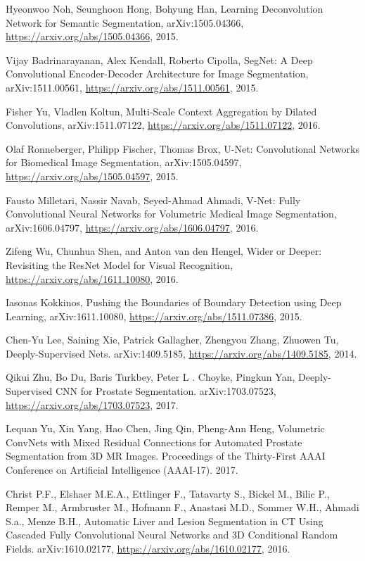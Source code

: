 \documentclass[11pt]{article}
\begin{document}
\begin{thebibliography}{9}
  Hyeonwoo Noh, Seunghoon Hong, Bohyung Han,
  Learning Deconvolution Network for Semantic Segmentation,
  arXiv:1505.04366,
  \url{https://arxiv.org/abs/1505.04366}, 2015.

  Vijay Badrinarayanan, Alex Kendall, Roberto Cipolla,
  SegNet: A Deep Convolutional Encoder-Decoder Architecture for Image Segmentation,
  arXiv:1511.00561,
  \url{https://arxiv.org/abs/1511.00561}, 2015.

  Fisher Yu, Vladlen Koltun,
  Multi-Scale Context Aggregation by Dilated Convolutions,
  arXiv:1511.07122,
  \url{https://arxiv.org/abs/1511.07122}, 2016.

  Olaf Ronneberger, Philipp Fischer, Thomas Brox,
  U-Net: Convolutional Networks for Biomedical Image Segmentation,
  arXiv:1505.04597,
  \url{https://arxiv.org/abs/1505.04597}, 2015.

  Fausto Milletari, Nassir Navab, Seyed-Ahmad Ahmadi,
  V-Net: Fully Convolutional Neural Networks for Volumetric Medical Image Segmentation,
  arXiv:1606.04797,
  \url{https://arxiv.org/abs/1606.04797}, 2016.

  Zifeng Wu, Chunhua Shen, and Anton van den Hengel,
  Wider or Deeper: Revisiting the ResNet Model for Visual Recognition,
  \url{https://arxiv.org/abs/1611.10080}, 2016.

  Iasonas Kokkinos,
  Pushing the Boundaries of Boundary Detection using Deep Learning,
  arXiv:1611.10080,
  \url{https://arxiv.org/abs/1511.07386}, 2015.

  Chen-Yu Lee, Saining Xie, Patrick Gallagher, Zhengyou Zhang, Zhuowen Tu,
  Deeply-Supervised Nets.
  arXiv:1409.5185,
  \url{https://arxiv.org/abs/1409.5185}, 2014.

  Qikui Zhu, Bo Du, Baris Turkbey, Peter L . Choyke, Pingkun Yan,
  Deeply-Supervised CNN for Prostate Segmentation.
  arXiv:1703.07523,
  \url{https://arxiv.org/abs/1703.07523}, 2017.

    Lequan Yu, Xin Yang, Hao Chen, Jing Qin, Pheng-Ann Heng,
    Volumetric ConvNets with Mixed Residual Connections for Automated Prostate Segmentation from 3D MR Images.
    Proceedings of the Thirty-First AAAI Conference on Artificial Intelligence (AAAI-17). 2017.

    Christ P.F.,  Elshaer M.E.A., Ettlinger F., Tatavarty S., Bickel M., Bilic P., Remper M., Armbruster M., Hofmann F., Anastasi M.D., Sommer W.H., Ahmadi S.a., Menze B.H.,
    Automatic Liver and Lesion Segmentation in CT Using Cascaded Fully Convolutional Neural Networks and 3D Conditional Random Fields.
    arXiv:1610.02177,
    \url{https://arxiv.org/abs/1610.02177}, 2016.

\end{thebibliography}
\end{document}
